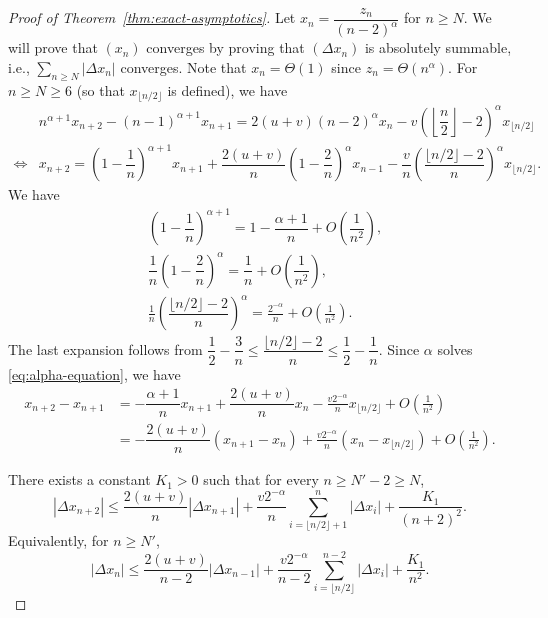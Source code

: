         \begin{proof}[Proof of Theorem~\ref{thm:exact-asymptotics}]
          Let $x_n=\dfrac{z_n}{(n-2)^\alpha}$ for $n\ge N$. We will prove that $(x_n)$ converges by proving that $(\Delta x_n)$ is absolutely summable, i.e., $\sum_{n\ge N}|\Delta x_n|$ converges. Note that $x_n = \Theta(1)$ since $z_n = \Theta(n^\alpha)$. For $n\ge N \ge 6$ (so that $x_{\lfloor n/2\rfloor}$ is defined), we have
          \begin{align*}
                 & n^{\alpha+1} x_{n+2} - (n-1)^{\alpha+1} x_{n+1} = 2(u+v)(n-2)^{\alpha}x_{n} - v\left(\left\lfloor \dfrac{n}{2}\right\rfloor-2\right)^{\alpha}x_{\lfloor n/2\rfloor}                                               \\
            \iff & x_{n+2} = \left(1-\dfrac{1}{n}\right)^{\alpha+1}x_{n+1} + \dfrac{2(u+v)}{n}\left(1-\dfrac{2}{n}\right)^{\alpha}x_{n-1} - \dfrac{v}{n}\left(\dfrac{\lfloor n/2\rfloor-2}{n}\right)^{\alpha}x_{\lfloor n/2\rfloor}.
          \end{align*}
          We have
          \begin{align*}
             & \left(1-\dfrac{1}{n}\right)^{\alpha+1} = 1 - \dfrac{\alpha+1}{n} + O\left(\dfrac{1}{n^2}\right),                        \\
             & \dfrac{1}{n}\left(1-\dfrac{2}{n}\right)^{\alpha} = \dfrac{1}{n} + O\left(\dfrac{1}{n^2}\right),                         \\
             & \frac{1}{n}\left(\dfrac{\lfloor n/2\rfloor-2}{n}\right)^{\alpha} = \frac{2^{-\alpha}}{n} + O\left(\frac{1}{n^2}\right).
          \end{align*}
          The last expansion follows from $\dfrac{1}{2}-\dfrac{3}{n} \le \dfrac{\lfloor n/2\rfloor-2}{n} \le \dfrac{1}{2}-\dfrac{1}{n}$. Since $\alpha$ solves \eqref{eq:alpha-equation}, we have
          \begin{align*}
            x_{n+2}-x_{n+1}
             & = -\dfrac{\alpha+1}{n}x_{n+1} + \dfrac{2(u+v)}{n}x_{n} - \frac{v2^{-\alpha}}{n}x_{\lfloor n/2\rfloor} + O\left(\frac{1}{n^2}\right)   \\
             & = -\dfrac{2(u+v)}{n}(x_{n+1}-x_{n}) + \frac{v2^{-\alpha}}{n}\left(x_{n}- x_{\lfloor n/2\rfloor}\right) + O\left(\frac{1}{n^2}\right).
          \end{align*}

          There exists a constant $K_1>0$ such that for every $n\ge N'-2 \ge N$,
          $$|\Delta x_{n+2}| \le \dfrac{2(u+v)}{n}|\Delta x_{n+1}| + \frac{v2^{-\alpha}}{n}\sum_{i=\lfloor n/2\rfloor + 1}^{n}|\Delta x_{i}| + \dfrac{K_1}{(n+2)^2}.$$
          Equivalently, for $n\ge N'$,
          $$|\Delta x_{n}| \le \dfrac{2(u+v)}{n-2}|\Delta x_{n-1}| + \frac{v2^{-\alpha}}{n-2}\sum_{i=\lfloor n/2\rfloor}^{n-2}|\Delta x_{i}| + \dfrac{K_1}{n^2}.$$


\end{proof}
